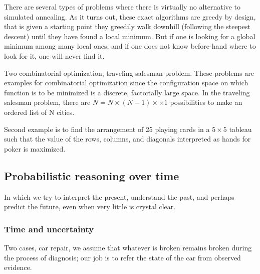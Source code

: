 There are several types of problems where there is virtually no alternative to simulated annealing. As it turns out, these exact algorithms are greedy by design, that is given a starting point they greedily walk downhill (following the steepest descent) until they have found a local minimum. But if one is looking for a global minimum among many local ones, and if one does not know before-hand where to look for it, one will never find it.

Two combinatorial optimization, traveling salesman problem. These problems are examples for combinatorial optimization since the configuration space on which function is to be minimized is a discrete, factorially large space. In the traveling salesman problem, there are $N = N \times (N-1) \times \times 1$ possibilities to make an ordered list of N cities.

Second example is to find the arrangement of 25 playing cards in a $5 \times 5$ tableau such that the value of the rows, columns, and diagonals interpreted as hands for poker is maximized.
\subsection{Probabilistic reasoning over time}
In which we try to interpret the present, understand the past, and perhaps predict the future, even when very little is crystal clear.
\subsubsection{Time and uncertainty}
Two cases, car repair, we assume that whatever is broken remains broken during the process of diagnosis; our job is to refer the state of the car from observed evidence.
